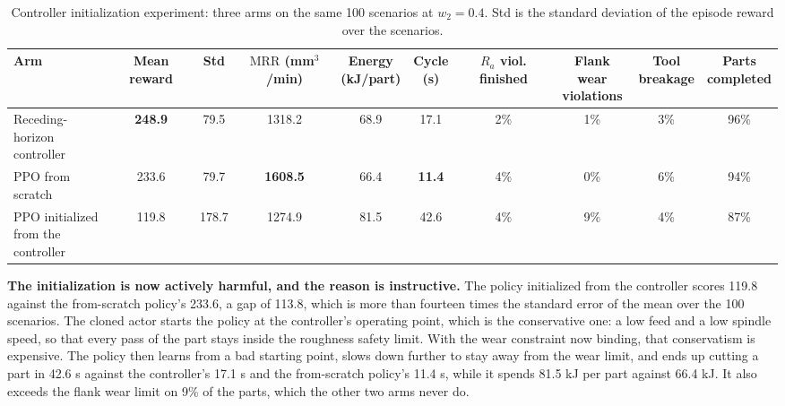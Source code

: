 \documentclass[11pt,a4paper]{article}
\newcommand{\alert}[1]{\textcolor{IITGold}{\textbf{#1}}}
\newcommand{\MRR}{\mathrm{MRR}}
\newcommand{\Ra}{R_a}
\begin{document}
\begin{table}[H]
\centering
\caption{Controller initialization experiment: three arms on the same 100 scenarios at $w_2 = 0.4$. Std is the standard deviation of the episode reward over the scenarios.}
\label{tab:controllerinit}
\scriptsize
\setlength{\tabcolsep}{2.5pt}
\begin{tabular}{@{}lccccccccc@{}}
\toprule
\textbf{Arm} & \textbf{Mean reward} & \textbf{Std} & \makecell{\textbf{$\MRR$}\\(mm$^3$/min)} & \makecell{\textbf{Energy}\\(kJ/part)} & \makecell{\textbf{Cycle}\\(s)} & \makecell{\textbf{$\Ra$ viol.}\\finished} & \makecell{\textbf{Flank wear}\\\textbf{violations}} & \makecell{\textbf{Tool}\\breakage} & \makecell{\textbf{Parts}\\completed} \\
\midrule
\makecell[l]{Receding-horizon\\controller} & \alert{248.9} & 79.5 & 1318.2 & 68.9 & 17.1 & 2\% & 1\% & 3\% & 96\% \\
PPO from scratch & 233.6 & 79.7 & \alert{1608.5} & 66.4 & \alert{11.4} & 4\% & 0\% & 6\% & 94\% \\
\makecell[l]{PPO initialized\\from the controller} & 119.8 & 178.7 & 1274.9 & 81.5 & 42.6 & 4\% & 9\% & 4\% & 87\% \\
\bottomrule
\end{tabular}
\end{table}

\textbf{The initialization is now actively harmful, and the reason is instructive.} The policy initialized from the controller scores 119.8 against the from-scratch policy's 233.6, a gap of 113.8, which is more than fourteen times the standard error of the mean over the 100 scenarios. The cloned actor starts the policy at the controller's operating point, which is the conservative one: a low feed and a low spindle speed, so that every pass of the part stays inside the roughness safety limit. With the wear constraint now binding, that conservatism is expensive. The policy then learns from a bad starting point, slows down further to stay away from the wear limit, and ends up cutting a part in 42.6 s against the controller's 17.1 s and the from-scratch policy's 11.4 s, while it spends 81.5 kJ per part against 66.4 kJ. It also exceeds the flank wear limit on 9\% of the parts, which the other two arms never do.
\end{document}
